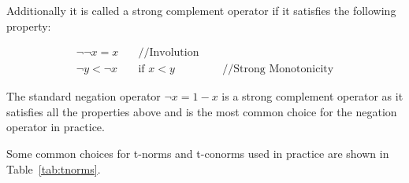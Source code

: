 Additionally it is called a strong complement operator if it satisfies the following property:

\begin{align}
      \neg \neg x = x & \quad \text{//Involution}                                       \\
      \neg y < \neg x & \quad \text{if } x < y    & \quad \text{ //Strong Monotonicity}
\end{align}


The standard negation operator $\neg x = 1 - x$ is a strong complement operator as it satisfies all the properties above and is the most common choice for the negation operator in practice.

Some common choices for t-norms and t-conorms used in practice are shown in Table~\ref{tab:tnorms}.

